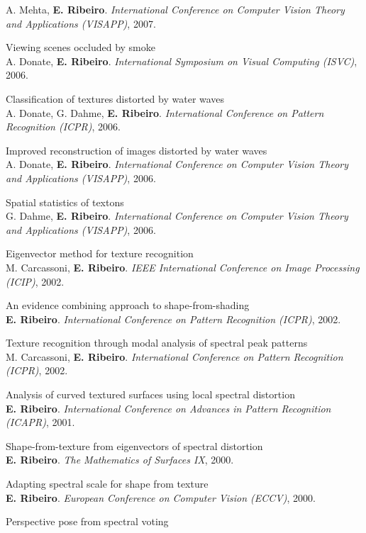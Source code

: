 \documentclass[11pt]{article}
\begin{document}
\begin{cvitems}
  A. Mehta, \textbf{E. Ribeiro}. \textit{International Conference on Computer Vision Theory and Applications (VISAPP)}, 2007.
  \item Viewing scenes occluded by smoke\\
  A. Donate, \textbf{E. Ribeiro}. \textit{International Symposium on Visual Computing (ISVC)}, 2006.
  \item Classification of textures distorted by water waves\\
  A. Donate, G. Dahme, \textbf{E. Ribeiro}. \textit{International Conference on Pattern Recognition (ICPR)}, 2006.
  \item Improved reconstruction of images distorted by water waves\\
  A. Donate, \textbf{E. Ribeiro}. \textit{International Conference on Computer Vision Theory and Applications (VISAPP)}, 2006.
  \item Spatial statistics of textons\\
  G. Dahme, \textbf{E. Ribeiro}. \textit{International Conference on Computer Vision Theory and Applications (VISAPP)}, 2006.
  \item Eigenvector method for texture recognition\\
  M. Carcassoni, \textbf{E. Ribeiro}. \textit{IEEE International Conference on Image Processing (ICIP)}, 2002.
  \item An evidence combining approach to shape-from-shading\\
  \textbf{E. Ribeiro}. \textit{International Conference on Pattern Recognition (ICPR)}, 2002.
  \item Texture recognition through modal analysis of spectral peak patterns\\
  M. Carcassoni, \textbf{E. Ribeiro}. \textit{International Conference on Pattern Recognition (ICPR)}, 2002.
  \item Analysis of curved textured surfaces using local spectral distortion\\
  \textbf{E. Ribeiro}. \textit{International Conference on Advances in Pattern Recognition (ICAPR)}, 2001.
  \item Shape-from-texture from eigenvectors of spectral distortion\\
  \textbf{E. Ribeiro}. \textit{The Mathematics of Surfaces IX}, 2000.
  \item Adapting spectral scale for shape from texture\\
  \textbf{E. Ribeiro}. \textit{European Conference on Computer Vision (ECCV)}, 2000.
  \item Perspective pose from spectral voting\\

\end{cvitems}
\end{document}

